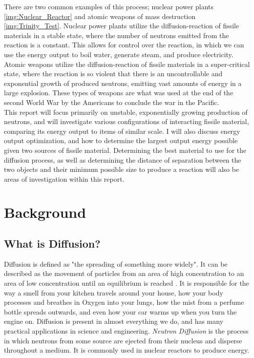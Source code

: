 \documentclass[letterpaper, 12pt]{article}
\begin{document}
      There are two common examples of this process; nuclear power plants \ref{img:Nuclear_Reactor} and atomic weapons of mass destruction \ref{img:Trinity_Test}. Nuclear power plants utilize the diffusion-reaction of fissile materials in a stable state, where the number of neutrons emitted from the reaction is a constant. This allows for control over the reaction, in which we can use the energy output to boil water, generate steam, and produce electricity. Atomic weapons utilize the diffusion-reaction of fissile materials in a super-critical state, where the reaction is so violent that there is an uncontrollable and exponential growth of produced neutrons, emitting vast amounts of energy in a large explosion. These types of weapons are what was used at the end of the second World War by the Americans to conclude the war in the Pacific. \\

      This report will focus primarily on unstable, exponentially growing production of neutrons, and will investigate various configurations of interacting fissile material, comparing its energy output to items of similar scale. I will also discuss energy output optimization, and how to determine the largest output energy possible given two sources of fissile material. Determining the best material to use for the diffusion process, as well as determining the distance of separation between the two objects and their minimum possible size to produce a reaction will also be areas of investigation within this report.

    \section{ Background}
      \subsection{What is Diffusion?}
         Diffusion is defined as "the spreading of something more widely". It can be described as the movement of particles from an area of high concentration to an area of low concentration until an equilibrium is reached \cite{Diffusion-Defn}. It is responsible for the way a smell from your kitchen travels around your house, how your body processes and breathes in Oxygen into your lungs, how the mist from a perfume bottle spreads outwards, and even how your car warms up when you turn the engine on. Diffusion is present in almost everything we do, and has many practical applications in science and engineering. \textit{Neutron Diffusion} is the process in which neutrons from some source are ejected from their nucleus and disperse throughout a medium. It is commonly used in nuclear reactors to produce energy. 
\end{document}
